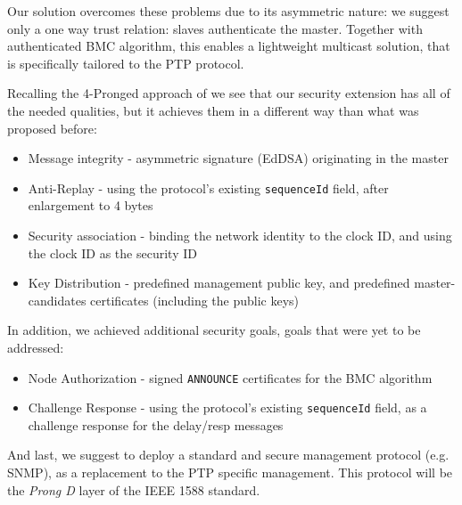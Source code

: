 \documentclass[11pt]{article}
\begin{document}
Our solution overcomes these problems due to its asymmetric nature: we suggest only a one way trust relation: slaves authenticate the master. Together with authenticated BMC algorithm, this enables a lightweight multicast solution, that is specifically tailored to the PTP protocol.



Recalling the 4-Pronged approach of \cite{Prongs} we see that our security extension has all of the needed qualities, but it achieves them in a different way than what was proposed before:

\begin{itemize}

  \item Message integrity - asymmetric signature (EdDSA) originating in the master

  \item Anti-Replay - using the protocol's existing \texttt{sequenceId} field, after enlargement to 4 bytes

  \item Security association - binding the network identity to the clock ID, and using the clock ID as the security ID

  \item Key Distribution - predefined management public key, and predefined master-candidates certificates (including the public keys)

\end{itemize}



In addition, we achieved additional security goals, goals that were yet to be addressed:

\begin{itemize}

  \item Node Authorization - signed \texttt{ANNOUNCE} certificates for the BMC algorithm

  \item Challenge Response - using the protocol's existing \texttt{sequenceId} field, as a challenge response for the delay/resp messages

\end{itemize}

And last, we suggest to deploy a standard and secure management protocol (e.g. SNMP), as a replacement to the PTP specific management. This protocol will be the \emph{Prong D} layer of the IEEE 1588 standard.
\end{document}

